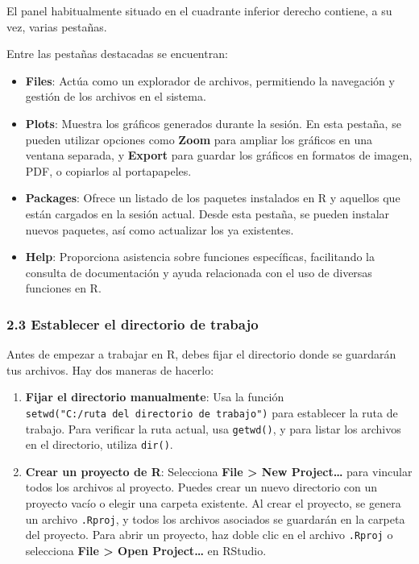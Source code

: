 \documentclass[
  letterpaper,
  DIV=11,
  numbers=noendperiod]{scrartcl}
\begin{document}
El panel habitualmente situado en el cuadrante inferior derecho
contiene, a su vez, varias pestañas.

Entre las pestañas destacadas se encuentran:

\begin{itemize}
\item
  \textbf{Files}: Actúa como un explorador de archivos, permitiendo la
  navegación y gestión de los archivos en el sistema.
\item
  \textbf{Plots}: Muestra los gráficos generados durante la sesión. En
  esta pestaña, se pueden utilizar opciones como \textbf{Zoom} para
  ampliar los gráficos en una ventana separada, y \textbf{Export} para
  guardar los gráficos en formatos de imagen, PDF, o copiarlos al
  portapapeles.
\item
  \textbf{Packages}: Ofrece un listado de los paquetes instalados en R y
  aquellos que están cargados en la sesión actual. Desde esta pestaña,
  se pueden instalar nuevos paquetes, así como actualizar los ya
  existentes.
\item
  \textbf{Help}: Proporciona asistencia sobre funciones específicas,
  facilitando la consulta de documentación y ayuda relacionada con el
  uso de diversas funciones en R.
\end{itemize}

\hypertarget{establecer-el-directorio-de-trabajo}{%
\subsubsection{2.3 Establecer el directorio de
trabajo}\label{establecer-el-directorio-de-trabajo}}

Antes de empezar a trabajar en R, debes fijar el directorio donde se
guardarán tus archivos. Hay dos maneras de hacerlo:

\begin{enumerate}
\def\labelenumi{\arabic{enumi}.}
\item
  \textbf{Fijar el directorio manualmente}: Usa la función
  \texttt{setwd("C:/ruta\ del\ directorio\ de\ trabajo")} para
  establecer la ruta de trabajo. Para verificar la ruta actual, usa
  \texttt{getwd()}, y para listar los archivos en el directorio, utiliza
  \texttt{dir()}.
\item
  \textbf{Crear un proyecto de R}: Selecciona \textbf{File
  \textgreater{} New Project\ldots{}} para vincular todos los archivos
  al proyecto. Puedes crear un nuevo directorio con un proyecto vacío o
  elegir una carpeta existente. Al crear el proyecto, se genera un
  archivo \texttt{.Rproj}, y todos los archivos asociados se guardarán
  en la carpeta del proyecto. Para abrir un proyecto, haz doble clic en
  el archivo \texttt{.Rproj} o selecciona \textbf{File \textgreater{}
  Open Project\ldots{}} en RStudio.
\end{enumerate}
\end{document}
